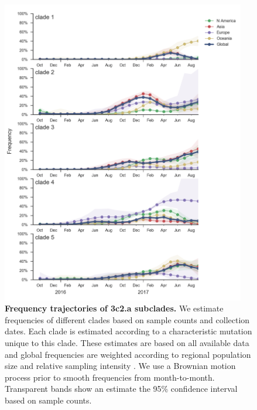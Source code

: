 \documentclass[11pt,oneside,letterpaper]{article}
\begin{document}
\begin{figure}[h!]
  \centering
  \includegraphics[width=0.95\textwidth]{../figures/sep-2017/h3n2_mutations.png}
  \caption{\textbf{Frequency trajectories of 3c2.a subclades.}
  We estimate frequencies of different clades based on sample counts and collection dates.
  Each clade is estimated according to a characteristic mutation unique to this clade.
  These estimates are based on all available data and global frequencies are weighted according to regional population size and relative sampling intensity .
  We use a Brownian motion process prior to smooth frequencies from month-to-month.
  Transparent bands show an estimate the 95\% confidence interval based on sample counts.
  }
  \label{h3n2_mutations}
\end{figure}
\end{document}
